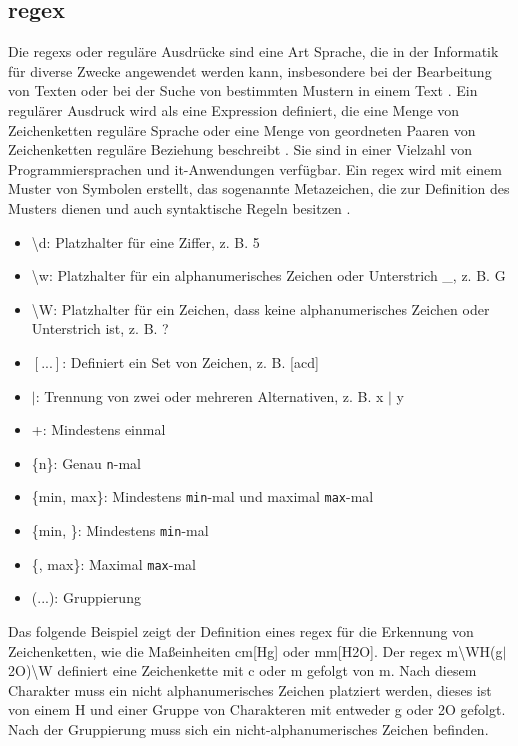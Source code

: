 \subsection{\acs{regex}} \label{sec:regex}
Die \acfp{regex} oder reguläre Ausdrücke sind eine Art Sprache, die in der Informatik für diverse Zwecke angewendet werden kann, insbesondere bei der Bearbeitung von Texten oder bei der Suche von bestimmten Mustern in einem Text \cite{regexconf}. Ein regulärer Ausdruck wird als eine Expression definiert, die eine Menge von Zeichenketten \glqq reguläre Sprache\grqq{} oder eine Menge von geordneten Paaren von Zeichenketten \glqq reguläre Beziehung\grqq{} beschreibt \cite{regexhandbook}. Sie sind in einer Vielzahl von Programmiersprachen und \ac{it}-Anwendungen verfügbar. Ein \ac{regex} wird mit einem Muster von Symbolen erstellt, das sogenannte Metazeichen, die zur Definition des Musters dienen und auch syntaktische Regeln besitzen \cite{regexweb1}.

\begin{itemize}
	\item \textbackslash d: Platzhalter für eine Ziffer, z. B. 5
	\item \textbackslash w: Platzhalter für ein alphanumerisches Zeichen oder Unterstrich \glqq\_\grqq{}, z. B. G
	\item \textbackslash W: Platzhalter für ein Zeichen, dass keine alphanumerisches Zeichen oder Unterstrich ist, z. B. ?
	\item $[...]$: Definiert ein Set von Zeichen, z. B.  [acd]
	\item $\vert$:  Trennung von zwei oder mehreren Alternativen, z. B. x $\vert$ y
	\item +: Mindestens einmal
	\item \{n\}: Genau \texttt{n}-mal
	\item \{min, max\}: Mindestens \texttt{min}-mal und maximal \texttt{max}-mal	
	\item \{min, \}: Mindestens \texttt{min}-mal
	\item \{, max\}: Maximal \texttt{max}-mal
	\item (...): Gruppierung
\end{itemize}

Das folgende Beispiel zeigt der Definition eines \ac{regex} für die Erkennung von Zeichenketten, wie die Maßeinheiten cm[Hg] oder mm[H2O]. Der \ac{regex} \glqq[cm]m\textbackslash WH(g$\vert$2O)\textbackslash W\grqq{} definiert eine Zeichenkette mit \glqq c\grqq{} oder \glqq m\grqq{} gefolgt von \glqq m\grqq{}. Nach diesem Charakter muss ein nicht alphanumerisches Zeichen platziert werden, dieses ist von einem \glqq H\grqq{} und einer Gruppe von Charakteren mit entweder \glqq g\grqq{} oder \glqq 2O\grqq{} gefolgt. Nach der Gruppierung muss sich ein nicht-alphanumerisches Zeichen befinden. 
